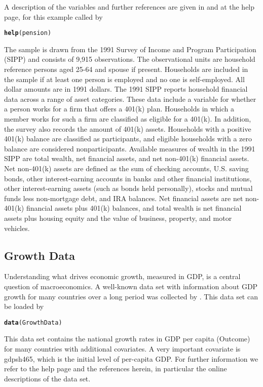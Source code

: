 \documentclass{amsart}\usepackage[]{graphicx}\usepackage[]{color}
\makeatletter
\newcommand{\hlstd}[1]{\textcolor[rgb]{0.345,0.345,0.345}{#1}}%
\newcommand{\hlkwd}[1]{\textcolor[rgb]{0.737,0.353,0.396}{\textbf{#1}}}%
\newenvironment{kframe}{%
 \def\at@end@of@kframe{}%
 \ifinner\ifhmode%
  \def\at@end@of@kframe{\end{minipage}}%
  \begin{minipage}{\columnwidth}%
 \fi\fi%
 \def\FrameCommand##1{\hskip\@totalleftmargin \hskip-\fboxsep
 \colorbox{shadecolor}{##1}\hskip-\fboxsep
     \hskip-\linewidth \hskip-\@totalleftmargin \hskip\columnwidth}%
 \MakeFramed {\advance\hsize-\width
   \@totalleftmargin\z@ \linewidth\hsize
   \@setminipage}}%
 {\par\unskip\endMakeFramed%
 \at@end@of@kframe}
\newenvironment{knitrout}{}{} %
\makeatother
\begin{document}
A description of the variables and further references are given in \citet{CH401k} and at the help page, for this example called by
\begin{knitrout}
\color{fgcolor}\begin{kframe}
\begin{alltt}
\hlkwd{help}\hlstd{(pension)}
\end{alltt}
\end{kframe}
\end{knitrout}

The sample is drawn from the 1991 Survey of Income and Program Participation (SIPP) and consists of 9,915 observations. The observational units are household reference persons aged 25-64 and spouse if present. Households are included in the sample if at least one person is employed and no one is self-employed. All dollar amounts are in 1991 dollars. The 1991 SIPP reports household financial data across a
range of asset categories. These data include a variable for
whether a person works for a firm that offers a 401(k) plan.
Households in which a member works for such a
firm are classified  as  eligible  for  a  401(k).  In  addition,  the  survey also records the amount of 401(k) assets. Households with
a positive 401(k) balance are classified as participants, and eligible  households  with  a  zero  balance  are  considered
nonparticipants. Available measures of wealth in the 1991 SIPP are total wealth, net financial  assets,  and  net  non-401(k) financial  assets.  Net non-401(k)  assets  are  defined  as  the  sum  of  checking  accounts,  U.S.  saving  bonds,  other interest-earning  accounts in  banks  and  other financial institutions,  other  interest-earning assets (such as bonds held personally), stocks and mutual funds less non-mortgage debt, and IRA balances. Net financial  assets  are  net  non-401(k) financial  assets  plus 401(k) balances, and total wealth is net financial assets plus housing  equity  and  the  value  of  business,  property,  and motor vehicles.


\subsection{Growth Data}
Understanding what drives economic growth, measured in GDP, is a central question of macroeconomics. A well-known data set with information about GDP growth for many countries over a long period was collected by \citet{BarroLee1994}. This data set can be loaded by
\begin{knitrout}
\color{fgcolor}\begin{kframe}
\begin{alltt}
\hlkwd{data}\hlstd{(GrowthData)}
\end{alltt}
\end{kframe}
\end{knitrout}
This data set contains the national growth rates in GDP per capita (Outcome) for many countries with additional covariates. A very important covariate is gdpsh465, which is the initial level of per-capita GDP. For further information we refer to the help page and the references herein, in particular the online descriptions of the data set.
\end{document}
